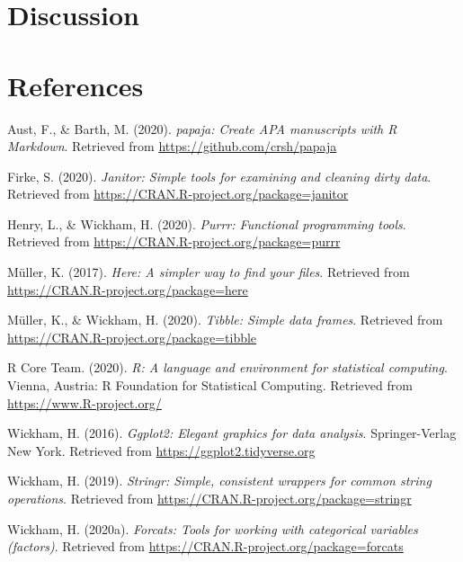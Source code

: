 \documentclass[
  english,
  man]{apa6}
\begin{document}
\hypertarget{discussion}{%
\section{Discussion}\label{discussion}}

\newpage

\hypertarget{references}{%
\section{References}\label{references}}

\begingroup
\setlength{\parindent}{-0.5in}
\setlength{\leftskip}{0.5in}

\hypertarget{refs}{}
\leavevmode\hypertarget{ref-R-papaja}{}%
Aust, F., \& Barth, M. (2020). \emph{papaja: Create APA manuscripts with R Markdown}. Retrieved from \url{https://github.com/crsh/papaja}

\leavevmode\hypertarget{ref-R-janitor}{}%
Firke, S. (2020). \emph{Janitor: Simple tools for examining and cleaning dirty data}. Retrieved from \url{https://CRAN.R-project.org/package=janitor}

\leavevmode\hypertarget{ref-R-purrr}{}%
Henry, L., \& Wickham, H. (2020). \emph{Purrr: Functional programming tools}. Retrieved from \url{https://CRAN.R-project.org/package=purrr}

\leavevmode\hypertarget{ref-R-here}{}%
Müller, K. (2017). \emph{Here: A simpler way to find your files}. Retrieved from \url{https://CRAN.R-project.org/package=here}

\leavevmode\hypertarget{ref-R-tibble}{}%
Müller, K., \& Wickham, H. (2020). \emph{Tibble: Simple data frames}. Retrieved from \url{https://CRAN.R-project.org/package=tibble}

\leavevmode\hypertarget{ref-R-base}{}%
R Core Team. (2020). \emph{R: A language and environment for statistical computing}. Vienna, Austria: R Foundation for Statistical Computing. Retrieved from \url{https://www.R-project.org/}

\leavevmode\hypertarget{ref-R-ggplot2}{}%
Wickham, H. (2016). \emph{Ggplot2: Elegant graphics for data analysis}. Springer-Verlag New York. Retrieved from \url{https://ggplot2.tidyverse.org}

\leavevmode\hypertarget{ref-R-stringr}{}%
Wickham, H. (2019). \emph{Stringr: Simple, consistent wrappers for common string operations}. Retrieved from \url{https://CRAN.R-project.org/package=stringr}

\leavevmode\hypertarget{ref-R-forcats}{}%
Wickham, H. (2020a). \emph{Forcats: Tools for working with categorical variables (factors)}. Retrieved from \url{https://CRAN.R-project.org/package=forcats}
\end{document}
